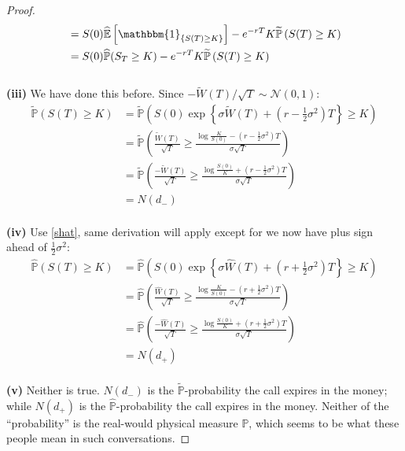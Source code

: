 \documentclass[a4paper, 10pt]{article}
\theoremstyle{definition}
\theoremstyle{hSol}
\begin{document}
\begin{proof}
\begin{equation}
\begin{split}
    &= S(0)\widehat{\mathbb{E}}\left[\mathbbm{1}_{\{S(T)\geq K\}}\right] - e^{-rT}K \widetilde{\mathbb{P}}\left(S(T)\geq K\right) \\
    &= S(0)\widehat{\mathbb{P}}(S_T\geq K) - e^{-rT}K \widetilde{\mathbb{P}}\left(S(T)\geq K\right) \\
  \end{split}
\end{equation}
~\\
\textbf{(iii)} We have done this before. Since $-\widetilde{W}(T)/\sqrt{T} \sim \mathcal{N}(0,1)$:
\begin{equation}
  \begin{split}
    \widetilde{\mathbb{P}}\left(S(T)\geq K\right)&=\widetilde{\mathbb{P}}\left(S(0) \exp\left\{\sigma \widetilde{W}(T) + \left(r-\frac{1}{2}\sigma^2\right)T\right\}\geq K\right)\\
    &=\widetilde{\mathbb{P}}\left(\frac{\widetilde{W}(T)}{\sqrt{T}} \geq \frac{\log \frac{K}{S(0)}-\left(r-\frac{1}{2}\sigma^2\right)T}{\sigma \sqrt{T}}\right)\\
    &=\widetilde{\mathbb{P}}\left(\frac{-\widetilde{W}(T)}{\sqrt{T}} \geq \frac{\log \frac{S(0)}{K}+\left(r-\frac{1}{2}\sigma^2\right)T}{\sigma \sqrt{T}}\right)\\
    &= N(d_-)
  \end{split}
\end{equation}
~\\
\textbf{(iv)} Use \ref{shat}, same derivation will apply except for we now have plus sign ahead of $\frac{1}{2}\sigma^2$: 
\begin{equation}
  \begin{split}
    \widehat{\mathbb{P}}\left(S(T)\geq K\right)&=\widehat{\mathbb{P}}\left(S(0) \exp\left\{\sigma \widehat{W}(T) + \left(r+\frac{1}{2}\sigma^2\right)T\right\}\geq K\right)\\
    &=\widehat{\mathbb{P}}\left(\frac{\widehat{W}(T)}{\sqrt{T}} \geq \frac{\log \frac{K}{S(0)}-\left(r+\frac{1}{2}\sigma^2\right)T}{\sigma \sqrt{T}}\right)\\
    &=\widehat{\mathbb{P}}\left(\frac{-\widehat{W}(T)}{\sqrt{T}} \geq \frac{\log \frac{S(0)}{K}+\left(r+\frac{1}{2}\sigma^2\right)T}{\sigma \sqrt{T}}\right)\\
    &= N(d_+)
  \end{split}
\end{equation}
~\\
\textbf{(v)} Neither is true. $N(d_-)$ is the $\widetilde{\mathbb{P}}$-probability the call expires in the money; while $N(d_+)$ is the $\widehat{\mathbb{P}}$-probability the call expires in the money. Neither of the ``probability'' is the real-would physical measure $\mathbb{P}$, which seems to be what these people mean in such conversations. 
\end{proof}
\end{document}
